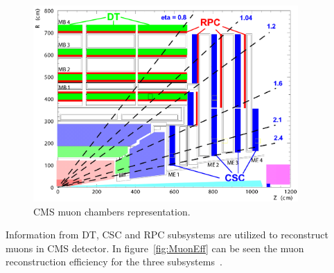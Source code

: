 \begin{figure}[!Hhtbp]
  \begin{center}
    \includegraphics[width=0.9\textwidth]{figs/MuonDetector.png}
    \caption{CMS muon chambers representation. }
    \label{fig:cmsmuon}
  \end{center}
\end{figure}

Information from DT, CSC and RPC subsystems are utilized to reconstruct muons in CMS detector. In figure~\ref{fig:MuonEff} can be seen the muon reconstruction efficiency for the three subsystems~\cite{Chatrchyan:2013sba}.  

